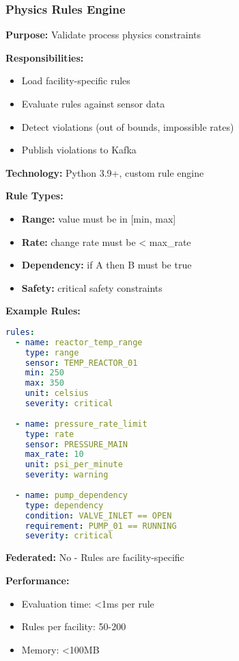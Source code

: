 \documentclass[12pt,a4paper]{article}
\begin{document}
\subsubsection{Physics Rules Engine}

\textbf{Purpose:} Validate process physics constraints

\textbf{Responsibilities:}
\begin{itemize}[leftmargin=1cm,itemsep=0pt]
    \item Load facility-specific rules
    \item Evaluate rules against sensor data
    \item Detect violations (out of bounds, impossible rates)
    \item Publish violations to Kafka
\end{itemize}

\textbf{Technology:} Python 3.9+, custom rule engine

\textbf{Rule Types:}
\begin{itemize}[leftmargin=1cm,itemsep=0pt]
    \item \textbf{Range:} value must be in [min, max]
    \item \textbf{Rate:} change rate must be < max\_rate
    \item \textbf{Dependency:} if A then B must be true
    \item \textbf{Safety:} critical safety constraints
\end{itemize}

\textbf{Example Rules:}
\begin{lstlisting}[language=yaml]
rules:
  - name: reactor_temp_range
    type: range
    sensor: TEMP_REACTOR_01
    min: 250
    max: 350
    unit: celsius
    severity: critical
  
  - name: pressure_rate_limit
    type: rate
    sensor: PRESSURE_MAIN
    max_rate: 10
    unit: psi_per_minute
    severity: warning
  
  - name: pump_dependency
    type: dependency
    condition: VALVE_INLET == OPEN
    requirement: PUMP_01 == RUNNING
    severity: critical
\end{lstlisting}

\textbf{Federated:} No - Rules are facility-specific

\textbf{Performance:}
\begin{itemize}[leftmargin=1cm,itemsep=0pt]
    \item Evaluation time: <1ms per rule
    \item Rules per facility: 50-200
    \item Memory: <100MB
\end{itemize}
\end{document}
